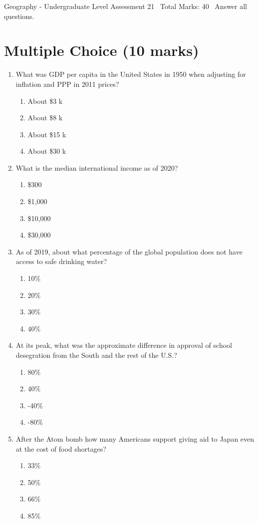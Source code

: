 \documentclass[12pt]{article}
\begin{document}
\begin{center}
Geography - Undergraduate Level Assessment 21 \
Total Marks: 40 \
Answer all questions.
\end{center}

\section*{Multiple Choice (10 marks)}
\begin{enumerate}[label=\arabic*.]
\item What was GDP per capita in the United States in 1950 when adjusting for inflation and PPP in 2011 prices?
\begin{enumerate}[label=(\alph*)]
    \item About \$3 k
    \item About \$8 k
    \item About \$15 k
    \item About \$30 k
\end{enumerate}
\item What is the median international income as of 2020?
\begin{enumerate}[label=(\alph*)]
    \item \$300
    \item \$1,000
    \item \$10,000
    \item \$30,000
\end{enumerate}
\item As of 2019, about what percentage of the global population does not have access to safe drinking water?
\begin{enumerate}[label=(\alph*)]
    \item 10\%
    \item 20\%
    \item 30\%
    \item 40\%
\end{enumerate}
\item At its peak, what was the approximate difference in approval of school desegration from the South and the rest of the U.S.?
\begin{enumerate}[label=(\alph*)]
    \item 80\%
    \item 40\%
    \item -40\%
    \item -80\%
\end{enumerate}
\item After the Atom bomb how many Americans support giving aid to Japan even at the cost of food shortages?
\begin{enumerate}[label=(\alph*)]
    \item 33\%
    \item 50\%
    \item 66\%
    \item 85\%
\end{enumerate}
\end{enumerate}
\end{document}
